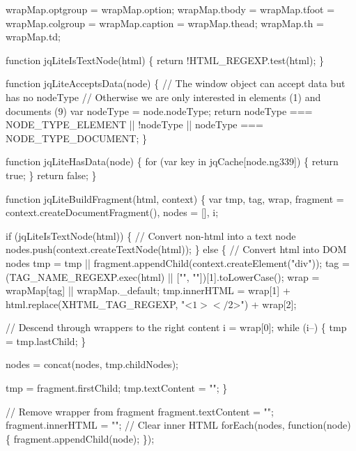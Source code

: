 \begin{DoxyCodeInclude}
{wrapMap.optgroup = wrapMap.option;
wrapMap.tbody = wrapMap.tfoot = wrapMap.colgroup = wrapMap.caption = wrapMap.thead;
wrapMap.th = wrapMap.td;


\textcolor{keyword}{function} jqLiteIsTextNode(html) \{
  \textcolor{keywordflow}{return} !HTML\_REGEXP.test(html);
\}

\textcolor{keyword}{function} jqLiteAcceptsData(node) \{
  \textcolor{comment}{// The window object can accept data but has no nodeType}
  \textcolor{comment}{// Otherwise we are only interested in elements (1) and documents (9)}
  var nodeType = node.nodeType;
  \textcolor{keywordflow}{return} nodeType === NODE\_TYPE\_ELEMENT || !nodeType || nodeType === NODE\_TYPE\_DOCUMENT;
\}

\textcolor{keyword}{function} jqLiteHasData(node) \{
  \textcolor{keywordflow}{for} (var key in jqCache[node.ng339]) \{
    \textcolor{keywordflow}{return} \textcolor{keyword}{true};
  \}
  \textcolor{keywordflow}{return} \textcolor{keyword}{false};
\}

\textcolor{keyword}{function} jqLiteBuildFragment(html, context) \{
  var tmp, tag, wrap,
      fragment = context.createDocumentFragment(),
      nodes = [], i;

  \textcolor{keywordflow}{if} (jqLiteIsTextNode(html)) \{
    \textcolor{comment}{// Convert non-html into a text node}
    nodes.push(context.createTextNode(html));
  \} \textcolor{keywordflow}{else} \{
    \textcolor{comment}{// Convert html into DOM nodes}
    tmp = tmp || fragment.appendChild(context.createElement(\textcolor{stringliteral}{"div"}));
    tag = (TAG\_NAME\_REGEXP.exec(html) || [\textcolor{stringliteral}{""}, \textcolor{stringliteral}{""}])[1].toLowerCase();
    wrap = wrapMap[tag] || wrapMap.\_default;
    tmp.innerHTML = wrap[1] + html.replace(XHTML\_TAG\_REGEXP, \textcolor{stringliteral}{"<$1></$2>"}) + wrap[2];

    \textcolor{comment}{// Descend through wrappers to the right content}
    i = wrap[0];
    \textcolor{keywordflow}{while} (i--) \{
      tmp = tmp.lastChild;
    \}

    nodes = concat(nodes, tmp.childNodes);

    tmp = fragment.firstChild;
    tmp.textContent = \textcolor{stringliteral}{""};
  \}

  \textcolor{comment}{// Remove wrapper from fragment}
  fragment.textContent = \textcolor{stringliteral}{""};
  fragment.innerHTML = \textcolor{stringliteral}{""}; \textcolor{comment}{// Clear inner HTML}
  forEach(nodes, \textcolor{keyword}{function}(node) \{
    fragment.appendChild(node);
  \});

}
\end{DoxyCodeInclude}
